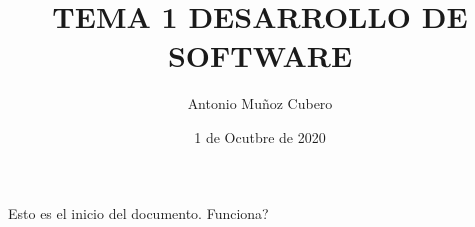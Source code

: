 \documentclass{article}
\title{TEMA 1 DESARROLLO DE SOFTWARE}
\author{Antonio Muñoz Cubero}
\date{1 de Ocutbre de 2020}
\begin{document}
    Esto es el inicio del documento.
    Funciona?
\end{document}
